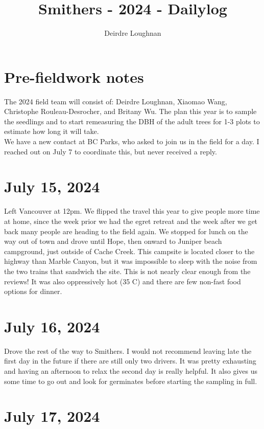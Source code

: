 \documentclass{article}\usepackage[]{graphicx}\usepackage[]{color}
\title{Smithers - 2024 - Dailylog}
\author{Deirdre Loughnan}
\begin{document}
\maketitle
\section*{Pre-fieldwork notes}

The 2024 field team will consist of: Deirdre Loughnan, Xiaomao Wang, Christophe Rouleau-Desrocher, and Britany Wu. The plan this year is to sample the seedlings and to start remeasuring the DBH of the adult trees for 1-3 plots to estimate how long it will take.  \\

We have a new contact at BC Parks, who asked to join us in the field for a day. I reached out on July 7 to coordinate this, but never received a reply.

\section*{July 15, 2024}

Left Vancouver at 12pm. We flipped the travel this year to give people more time at home, since the week prior we had the egret retreat and the week after we get back many people are heading to the field again. We stopped for lunch on the way out of town and drove until Hope, then onward to Juniper beach campground, just outside of Cache Creek. This campsite is located closer to the highway than Marble Canyon, but it was impossible to sleep with the noise from the two trains that sandwich the site. This is not nearly clear enough from the reviews! It was also oppressively hot (35 \textdegree C) and there are few non-fast food options for dinner.

\section*{July 16, 2024}

Drove the rest of the way to Smithers. I would not recommend leaving late the first day in the future if there are still only two drivers. It was pretty exhausting and having an afternoon to relax the second day is really helpful. It also gives us some time to go out and look for germinates before starting the sampling in full.

\section*{July 17, 2024}
\end{document}
